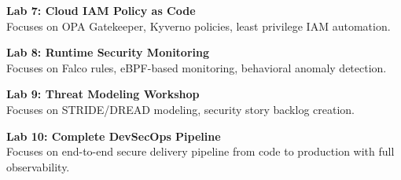 \vspace{0.2cm}

\noindent\textbf{Lab 7: Cloud IAM Policy as Code} \\
Focuses on OPA Gatekeeper, Kyverno policies, least privilege IAM automation.

\vspace{0.2cm}

\noindent\textbf{Lab 8: Runtime Security Monitoring} \\
Focuses on Falco rules, eBPF-based monitoring, behavioral anomaly detection.

\vspace{0.2cm}

\noindent\textbf{Lab 9: Threat Modeling Workshop} \\
Focuses on STRIDE/DREAD modeling, security story backlog creation.

\vspace{0.2cm}

\noindent\textbf{Lab 10: Complete DevSecOps Pipeline} \\
Focuses on end-to-end secure delivery pipeline from code to production with full observability.

\vspace{0.2cm}

\newpage
{}
